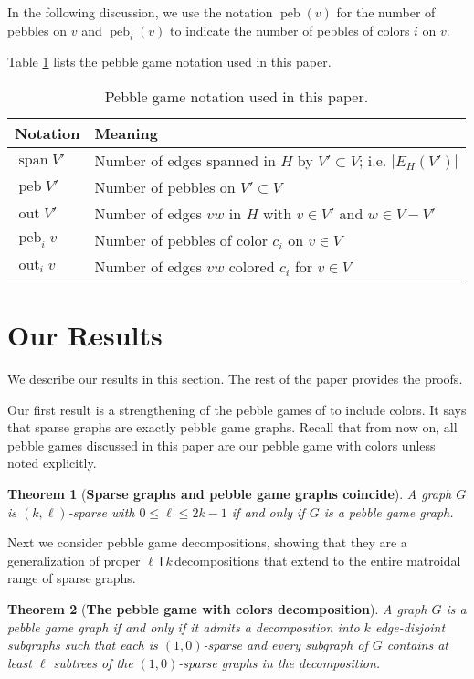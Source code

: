 \documentclass[11pt]{article}
\newcommand{\ellteekay}{\ensuremath{\ell{\mathsf T}k}\,}
\newcommand{\card}[1]{\ensuremath{\left\vert #1 \right\vert}}
\newtheorem{theorem}{Theorem}
\newcommand{\labelthm}[1]{\label{thm.#1}}
\newcommand{\peb}{\ensuremath{\operatorname{peb}}}
\newcommand{\grsp}{\ensuremath{\operatorname{span}}}
\newcommand{\out}{\ensuremath{\operatorname{out}}}
\begin{document}
	
In the following discussion, we use the notation
$\peb(v)$ for the number of pebbles on $v$ and $\peb_i(v)$
to indicate the number of pebbles of colors $i$ on $v$.

Table \ref{tab.pebble-notations} lists the pebble game notation used in this paper.
\begin{table}
	\centering 
	\begin{tabular}
		{|l|l|} \hline {\bf Notation} & {\bf Meaning} \\
		\hline \hline
		$\grsp V'$ & Number of edges spanned in $H$ by $V'\subset V$; i.e. $\card{E_{H}(V')}$\\
		\hline $\peb V'$ &Number of pebbles on $V'\subset V$ \\
		\hline $\out V'$ & Number of edges $vw$ in $H$ with $v\in V'$ and $w\in V-V'$ \\
		\hline $\peb_{i} v$ &Number of pebbles of color $c_{i}$ on $v\in V$ \\
		\hline $\out_{i} v$ & Number of edges $vw$ colored $c_i$ for $v\in V$ \\
		\hline
	\end{tabular}
	\caption{Pebble game notation used in this paper.} 
	\label{tab.pebble-notations} 
\end{table}


\section{Our Results} We describe our results in this section. 
The rest of the paper provides the proofs.

Our first result is a strengthening of the pebble games of \cite{LeSt05} 
to include colors.  It says that sparse graphs are exactly pebble game 
graphs.  Recall that from now on, all pebble games discussed in this 
paper are our pebble game with colors unless noted explicitly.
\begin{theorem}[{\bf Sparse graphs and pebble game graphs coincide}]
\labelthm{sparse-graphs-are-pebble-graphs}
A graph $G$  is $(k,\ell)$-sparse  with $0\le\ell\le 2k-1$ if and only if $G$ is a pebble game graph.
\end{theorem}
	
Next we consider pebble game decompositions, showing that they are a generalization of 
proper \ellteekay decompositions that extend to the entire matroidal range of sparse
graphs.

\begin{theorem}[{\bf The pebble game with colors decomposition}] \labelthm{non-canonical-decomposition}
	A graph $G$ is a pebble game graph if and only if it admits a decomposition into $k$	
	edge-disjoint subgraphs such that each  is $(1,0)$-sparse and every subgraph of $G$ 
	contains at least $\ell$  subtrees of the $(1,0)$-sparse graphs in the decomposition.
\end{theorem}
\end{document}
